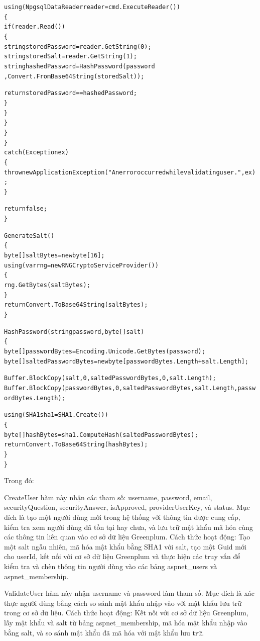\documentclass[14pt]{article}
\begin{document}
\begin{mdframed}[backgroundcolor=white, linecolor=black, roundcorner=5pt]
\begin{alltt}
                using (NpgsqlDataReader reader = cmd.ExecuteReader())
                \{
                    if (reader.Read())
                    \{
                        string storedPassword = reader.GetString(0);
                        string storedSalt = reader.GetString(1);
                        string hashedPassword = HashPassword(password
                        , Convert.FromBase64String(storedSalt));

                        return storedPassword == hashedPassword;
                    \}
                \}
            \}
        \}
    \}
    catch (Exception ex)
    \{
       throw new ApplicationException("An error occurred while validating user.", ex);
    \}

    return false;
\}

GenerateSalt()
\{
    byte[] saltBytes = new byte[16];
    using (var rng = new RNGCryptoServiceProvider())
    \{
        rng.GetBytes(saltBytes);
    \}
    return Convert.ToBase64String(saltBytes);
\}

HashPassword(string password, byte[] salt)
\{
    byte[] passwordBytes = Encoding.Unicode.GetBytes(password);
    byte[] saltedPasswordBytes = new byte[passwordBytes.Length + salt.Length];

    Buffer.BlockCopy(salt, 0, saltedPasswordBytes, 0, salt.Length);
    Buffer.BlockCopy(passwordBytes, 0, saltedPasswordBytes, salt.Length, passwordBytes.Length);

    using (SHA1 sha1 = SHA1.Create())
    \{
        byte[] hashBytes = sha1.ComputeHash(saltedPasswordBytes);
        return Convert.ToBase64String(hashBytes);
    \}
\}
\end{alltt}
\end{mdframed}

Trong đó:

CreateUser hàm này nhận các tham số: username, password, email, securityQuestion, securityAnswer, isApproved, providerUserKey, và status. Mục đích là tạo một người dùng mới trong hệ thống với thông tin được cung cấp, kiểm tra xem người dùng đã tồn tại hay chưa, và lưu trữ mật khẩu mã hóa cùng các thông tin liên quan vào cơ sở dữ liệu Greenplum. Cách thức hoạt động: Tạo một salt ngẫu nhiên, mã hóa mật khẩu bằng SHA1 với salt, tạo một Guid mới cho userId, kết nối với cơ sở dữ liệu Greenplum và thực hiện các truy vấn để kiểm tra và chèn thông tin người dùng vào các bảng aspnet\_users và aspnet\_membership.


ValidateUser hàm này nhận username và password làm tham số. Mục đích là xác thực người dùng bằng cách so sánh mật khẩu nhập vào với mật khẩu lưu trữ trong cơ sở dữ liệu. Cách thức hoạt động: Kết nối với cơ sở dữ liệu Greenplum, lấy mật khẩu và salt từ bảng aspnet\_membership, mã hóa mật khẩu nhập vào bằng salt, và so sánh mật khẩu đã mã hóa với mật khẩu lưu trữ.
\end{document}
